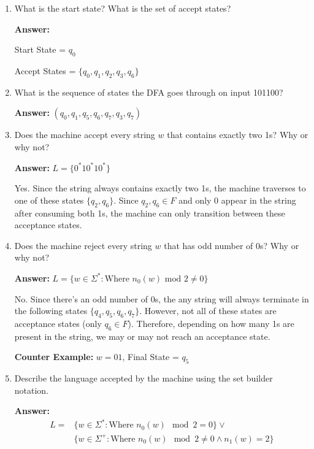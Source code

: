 \documentclass[12pt]{article}
\begin{document}
\begin{enumerate}
	      \begin{enumerate}
		      \item What is the start state? What is the set of accept states?

		            \noindent \textbf{Answer:}

		            Start State = $q_0$

		            Accept States = $\{q_0, q_1, q_2, q_3, q_6\}$

		      \item What is the sequence of states the DFA goes through on input 101100?

		            \noindent \textbf{Answer:} $(q_0, q_1, q_5, q_6, q_7, q_3, q_7)$

		      \item Does the machine accept every string $w$ that contains exactly two 1s? Why or why not?

		            \noindent \textbf{Answer:} $L = \{0^*10^*10^* \}$

		            Yes. Since the string always contains exactly two 1s, the machine traverses to one of these states $\{q_2, q_6 \}$. Since $q_2, q_6 \in F$ and only 0 appear in the string after consuming both 1s, the machine can only transition between these acceptance states.

		      \item Does the machine reject every string $w$ that has odd number of 0s? Why or why not?

		            \noindent \textbf{Answer:} $L = \{w \in \Sigma^* : \text{Where $n_0(w)$ mod $2 \neq 0$} \}$

		            No. Since there's an odd number of 0s, the any string will always terminate in the following states $\{q_4, q_5, q_6, q_7 \}$. However, not all of these states are acceptance states (only $q_6 \in F$). Therefore, depending on how many 1s are present in the string, we may or may not reach an acceptance state.

		            \textbf{Counter Example:} $w = 01$, Final State = $q_5$

		      \item Describe the language accepted by the machine using the set builder notation.

		            \noindent \textbf{Answer:}
		            \begin{equation}
			            \begin{split}
				            L = & \{w \in \Sigma^* : \text{Where } n_0(w) \mod 2 = 0 \} \lor \\ & \{w \in \Sigma^+ : \text{Where } n_0(w) \mod 2 \neq 0 \land n_1(w) = 2 \}
			            \end{split}
		            \end{equation}


\end{enumerate}
\end{enumerate}
\end{document}

